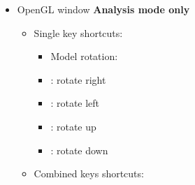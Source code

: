 {\begin{itemize}
\begin{itemize}
\begin{itemize}
\item Selection: \\
\item[] \Ctrl +  : select / unselect all atoms
\item[] \Ctrl +  : copy all selected atom(s)
\item[] \Ctrl +  : create new (empty project) \\
\item Misc: \\
\item[] \Ctrl +  : label / unlabel all atoms 
\item[] \Ctrl +  :  window [Sec.~\ref{ecw}]
\item[] \Ctrl +  :  dialog [Sec.~\ref{mdw}]
\item[] \Ctrl +  :  dialog [Sec.~\ref{rdw}]
\item[] \Ctrl +  : enter / exit fullscreen mode \\ 
\item Camero motion: \\
\item[] \Shift + \UArrow : zoom out
\item[] \Shift + \DArrow : zoom in \\
\end{itemize}
\end{itemize}
\item OpenGL window {\bf{Analysis mode only}}
\begin{itemize}
\item Single key shortcuts: \\
\begin{itemize}
\item Model rotation: \\
\item[] \RArrow : rotate right
\item[] \LArrow : rotate left
\item[] \UArrow : rotate up
\item[] \DArrow : rotate down \\
\end{itemize}
\newpage
\item Combined keys shortcuts: \\

\end{itemize}
\end{itemize}}
